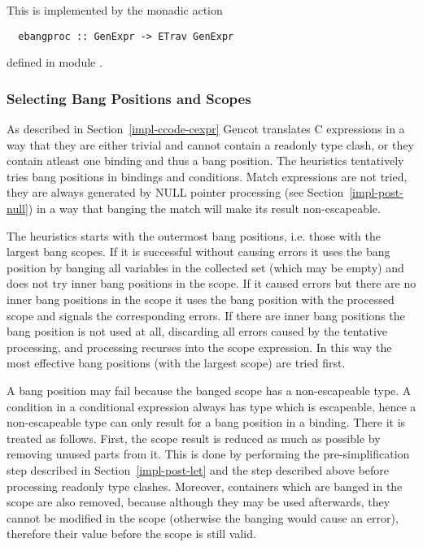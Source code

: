 This is implemented by the monadic action
\begin{verbatim}
  ebangproc :: GenExpr -> ETrav GenExpr
\end{verbatim}
defined in module .

\subsubsection{Selecting Bang Positions and Scopes}

As described in Section~\ref{impl-ccode-cexpr} Gencot translates C expressions in a way that they are either trivial and cannot
contain a readonly type clash, or they contain atleast one binding and thus a bang position. The heuristics tentatively tries
bang positions in bindings and conditions. Match expressions are not tried, they are always generated by NULL pointer processing
(see Section~\ref{impl-post-null}) in a way that banging the match will make its result non-escapeable.

The heuristics starts with the outermost bang positions, i.e. those with the largest bang scopes. If it is successful without
causing errors it uses the bang position by banging all variables in the collected set (which may be empty) and does not try
inner bang positions in the scope. If it caused errors but there are no inner bang positions in the scope it uses the bang
position with the processed scope and signals the corresponding errors. If there are inner bang positions the bang position
is not used at all, discarding all errors caused by the tentative processing, and processing recurses into the scope expression.
In this way the most effective bang positions (with the largest scope) are tried first.

A bang position may fail because the banged scope has a non-escapeable type. A condition in a conditional expression always
has type  which is escapeable, hence a non-escapeable type can only result for a bang position in a binding. There
it is treated as follows. First, the scope result is reduced as much as possible by removing unused parts from it.
This is done by performing the pre-simplification step  described in Section~\ref{impl-post-let} and the step
 described above before processing readonly type clashes. Moreover, containers which are banged in the scope
are also removed, because although they may be used afterwards, they cannot be modified in the scope (otherwise the banging
would cause an error), therefore their value before the scope is still valid.

